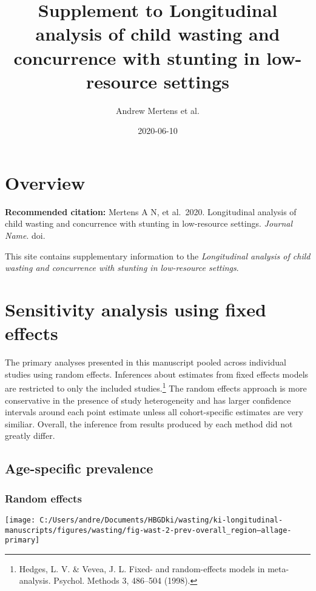 \documentclass[
  9pt,
]{book}
\title{Supplement to Longitudinal analysis of child wasting and concurrence with stunting in low-resource settings}
\author{Andrew Mertens et al.}
\date{2020-06-10}
\begin{document}
\maketitle

{
\setcounter{tocdepth}{1}
\tableofcontents
}
\hypertarget{overview}{%
\chapter{Overview}\label{overview}}

\textbf{Recommended citation:} Mertens A N, et al.~2020. Longitudinal analysis of child wasting and concurrence with stunting in low-resource settings. \emph{Journal Name}. doi.

This site contains supplementary information to the \emph{Longitudinal analysis of child wasting and concurrence with stunting in low-resource settings}.

\hypertarget{fixed-effects}{%
\chapter{Sensitivity analysis using fixed effects}\label{fixed-effects}}

\raggedright

The primary analyses presented in this manuscript pooled across individual studies using random effects. Inferences about estimates from fixed effects models are restricted to only the included studies.\footnote{Hedges, L. V. \& Vevea, J. L. Fixed- and random-effects models in meta-analysis. Psychol. Methods 3, 486--504 (1998).} The random effects approach is more conservative in the presence of study heterogeneity and has larger confidence intervals around each point estimate unless all cohort-specific estimates are very similiar. Overall, the inference from results produced by each method did not greatly differ.

\hypertarget{age-specific-prevalence}{%
\section{Age-specific prevalence}\label{age-specific-prevalence}}

\hypertarget{random-effects}{%
\subsection{Random effects}\label{random-effects}}

\texttt{[image: C:/Users/andre/Documents/HBGDki/wasting/ki-longitudinal-manuscripts/figures/wasting/fig-wast-2-prev-overall\_region--allage-primary]}
\end{document}
